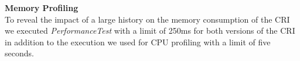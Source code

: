 	\textbf{Memory Profiling}\\
	To reveal the impact of a large history on the memory consumption of the CRI we executed \emph{PerformanceTest} with a limit of 250ms for both versions of the CRI in addition to the execution we used for CPU profiling with a limit of five seconds.
	\begin{figure}[!h]
		\centering
		\hspace{1cm}
		\hspace{10cm} %

\end{figure}
